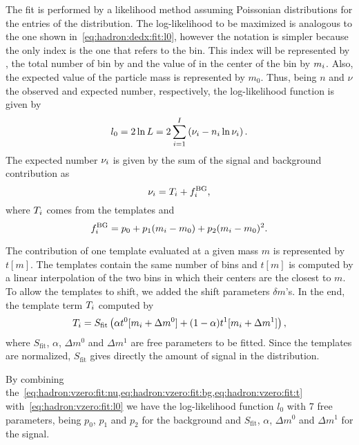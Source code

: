 The fit is performed by a likelihood method assuming Poissonian
distributions for the entries of the \minv distribution.
The log-likelihood to be maximized is analogous to the one shown
in~\cref{eq:hadron:dedx:fit:l0}, however the notation is
simpler because the only index is the one
that refers to the \minv bin. This index will be represented by \imass,
the total number of \minv bin by \nmass and the value of \minv in the center
of the bin by $m_i$. Also, the expected value of the particle mass
is represented by $m_0$.
Thus, being $n$ and $\nu$ the observed and expected number, respectively,
the log-likelihood function is given by
\begin{equation}
  l_0 = 2\ln L = 2\sum_{i=1}^{I} \left(\nu_{i} - n_{i}\ln\nu_{i}\right). 
  \label{eq:hadron:vzero:fit:l0}
\end{equation}
The expected number $\nu_i$ is given by the sum of the signal
and background contribution as
\begin{equation}
  \nu_i = T_i + f^\text{BG}_i, 
  \label{eq:hadron:vzero:fit:nu}
\end{equation}
where $T_i$ comes from the templates and
\begin{equation}
  f^\text{BG}_i = p_0 + p_1(m_i-m_0)+p_2(m_i-m_0)^2.
  \label{eq:hadron:vzero:fit:bg}
\end{equation}


The contribution of one template evaluated at a given
mass $m$ is represented by $t[m]$. The templates contain
the same number of bins \nmass and $t[m]$ is computed
by a linear interpolation of the two bins
in which their centers are the closest to $m$.
To allow the templates to shift, we added the
shift parameters $\delta m$'s. In the end,
the template term $T_i$ computed by
\begin{equation}
  T_i = S_\text{fit}\left(\alpha t^0[m_i+\Delta m^0]+ (1-\alpha)t^1[m_i+\Delta m^1]\right),
  \label{eq:hadron:vzero:fit:t}
\end{equation}
where $S_\text{fit}$, $\alpha$, $\Delta m^0$ and $\Delta m^1$ are
free parameters to be fitted.
Since the templates are normalized, $S_\text{fit}$ gives
directly the amount of signal in the distribution.

By combining the~\cref{eq:hadron:vzero:fit:nu,eq:hadron:vzero:fit:bg,eq:hadron:vzero:fit:t}
with~\cref{eq:hadron:vzero:fit:l0} we have the log-likelihood function $l_0$
with 7 free parameters, being $p_0$, $p_1$ and $p_2$
for the background and $S_\text{fit}$, $\alpha$, $\Delta m^0$ and $\Delta m^1$
for the signal.


